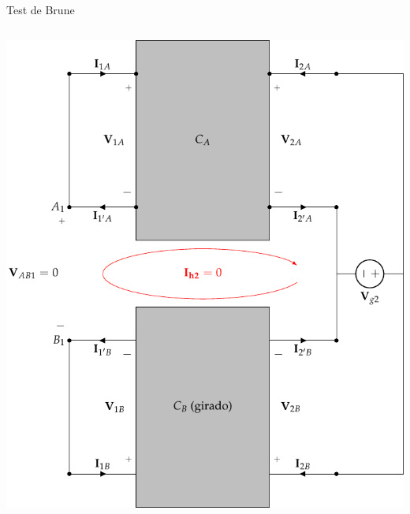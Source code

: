 \documentclass[xcolor={usenames,svgnames,dvipsnames}]{beamer}
\begin{document}
\begin{frame}[label={sec:org5d7984d},plain]{Test de Brune}
\begin{columns}
\begin{column}{0.65\columnwidth}
\begin{center}
\includegraphics[width=.9\linewidth]{figs/paralelo-paralelo-brune-salida.pdf}
\end{center}
\end{column}
\end{columns}
\end{frame}
\end{document}
